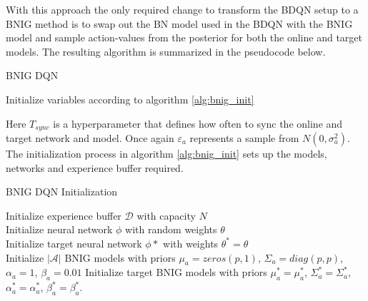 With this approach the only required change to transform the BDQN setup to a BNIG method is to swap out the BN model used in the BDQN with the BNIG model and sample action-values from the posterior for both the online and target models. The resulting algorithm is summarized in the pseudocode below.

\begin{algorithm}[H]
    \caption{BNIG DQN}
    Initialize variables according to algorithm \ref{alg:bnig_init}\\
\end{algorithm}

Here $T_{sync}$ is a hyperparameter that defines how often to sync the online and target network and model. Once again $\varepsilon_a$ represents a sample from $N(0,\sigma^2_a)$. The initialization process in algorithm \ref{alg:bnig_init} sets up the models, networks and experience buffer required.

\begin{algorithm}[H]
    \caption{BNIG DQN Initialization}
    \label{alg:bnig_init}
    Initialize experience buffer $\mathcal{D}$ with capacity $N$\\
    Initialize neural network $\phi$ with random weights $\theta$\\
    Initialize target neural network $\phi*$ with weights $\theta^*=\theta$\\
    Initialize $|\mathcal{A}|$ BNIG models with priors $\mu_a = zeros(p,1)$, $\Sigma_a = diag(p,p)$, $\alpha_a = 1$, $\beta_a = 0.01$
    Initialize target BNIG models with priors $\mu^*_a = \mu^*_a$, $\Sigma^*_a = \Sigma^*_a$, $\alpha^*_a = \alpha^*_a$, $\beta^*_a = \beta^*_a$.
\end{algorithm}


